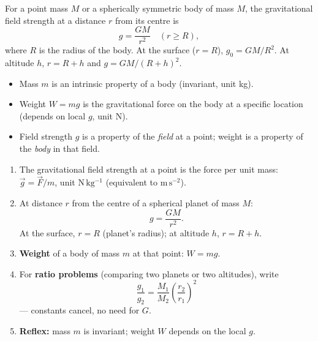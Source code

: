 \documentclass[11pt]{article}
\newcommand{\cle}[1]{{\popxbold\color{popdark}#1}}
\begin{document}
\begin{propriete}
For a point mass $M$ or a spherically symmetric body of mass $M$, the gravitational field strength at a distance $r$ from its centre is
\[ g = \frac{GM}{r^{2}} \quad (r \geq R), \]
where $R$ is the radius of the body. At the surface ($r = R$), $g_0 = GM/R^{2}$. At altitude $h$, $r = R + h$ and $g = GM/(R+h)^{2}$.
\end{propriete}

\begin{aretenir}
\begin{itemize}
\item \cle{Mass} $m$ is an intrinsic property of a body (invariant, unit kg).
\item \cle{Weight} $W = mg$ is the gravitational force on the body at a specific location (depends on local $g$, unit N).
\item Field strength $g$ is a property of the \emph{field} at a point; weight is a property of the \emph{body} in that field.
\end{itemize}
\end{aretenir}

\begin{methode}[Using $g = GM/r^{2}$ and relating field strength to weight]
\begin{enumerate}
\item The \cle{gravitational field strength} at a point is the force per unit mass: $\vec{g} = \vec{F}/m$, unit $\mathrm{N\,kg^{-1}}$ (equivalent to $\mathrm{m\,s^{-2}}$).
\item At distance $r$ from the centre of a spherical planet of mass $M$:
\[ g = \frac{GM}{r^{2}}. \]
At the surface, $r = R$ (planet's radius); at altitude $h$, $r = R + h$.
\item \textbf{Weight} of a body of mass $m$ at that point: $W = mg$.
\item For \textbf{ratio problems} (comparing two planets or two altitudes), write
\[ \frac{g_1}{g_2} = \frac{M_1}{M_2}\left(\frac{r_2}{r_1}\right)^{2} \]
— constants cancel, no need for $G$.
\item \textbf{Reflex:} mass $m$ is invariant; weight $W$ depends on the local $g$.
\end{enumerate}
\end{methode}
\end{document}
